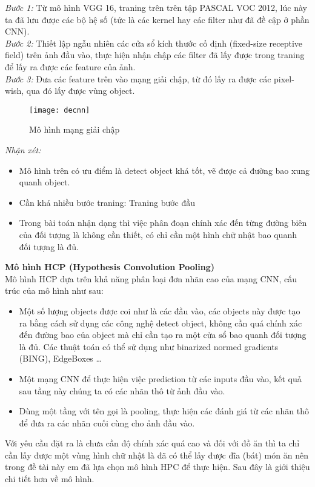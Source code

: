 \documentclass[13pt, a4paper]{extreport}
\begin{document}
\indent \textit{Bước 1:} Từ mô hình VGG 16, traning trên trên tập PASCAL VOC 2012, lúc này ta đã lưu được các bộ hệ số (tức là các kernel hay các filter như đã đề cập ở phần CNN).\\
\indent \textit{Bước 2:} Thiết lập ngẫu nhiên các cửa sổ kích thước cố định (fixed-size receptive field) trên ảnh đầu vào, thực hiện nhận chập các filter đã lấy được trong traning để lấy ra được các feature của ảnh.\\
\indent \textit{Bước 3:} Đưa các feature trên vào mạng giải chập, từ đó lấy ra được các pixel-wish, qua đó lấy được vùng object.
\begin{figure}[H]
  \centering
    \texttt{[image: decnn]}
   \caption{\large Mô hình mạng giải chập}
\end{figure}
\indent \textit{Nhận xét:}
\begin{itemize}
\item Mô hình trên có ưu điểm là detect object khá tốt, vẽ được cả đường bao xung quanh object.
\item Cần khá nhiều bước traning: Traning bước đầu
\item Trong bài toán nhận dạng thì việc phân đoạn chính xác đến từng đường biên của đối tượng là không cần thiết, có chỉ cần một hình chữ nhật bao quanh đối tượng là đủ.
\end{itemize}

\indent \textbf{Mô hình HCP (Hypothesis Convolution Pooling)}\\
\indent Mô hình HCP dựa trên khả năng phân loại đơn nhãn cao của mạng CNN, cấu trúc của mô hình như sau:
\begin {itemize}
\item Một số lượng objects được coi như là các đầu vào, các objects này được tạo ra bằng cách sử dụng các công nghệ detect object, không cần quá chính xác đến đường bao của object mà chỉ cần tạo ra một cửa sổ bao quanh đối tượng là đủ. Các thuật toán có thể sử dụng như binarized normed gradients (BING), EdgeBoxes …
\item Một mạng CNN để thực hiện việc prediction từ các inputs đầu vào, kết quả sau tầng này chúng ta có các nhãn thô từ ảnh đầu vào.
\item Dùng một tầng với tên gọi là pooling, thực hiện các đánh giá từ các nhãn thô để đưa ra các nhãn cuối cùng cho ảnh đầu vào.
\end{itemize}
\newpage
\indent Với yêu cầu đặt ra là chưa cần độ chính xác quá cao và đối với đồ ăn thì ta chỉ cần lấy được một vùng hình chữ nhật là đã có thể lấy được đĩa (bát) món ăn nên trong đề tài này em đã lựa chọn mô hình HPC để thực hiện. Sau đây là giới thiệu chi tiết hơn về mô hình.
\end{document}
